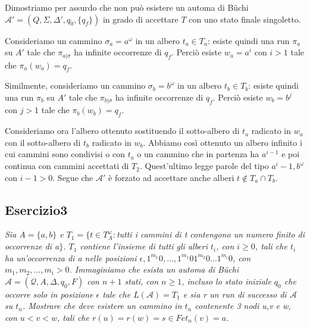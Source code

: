 \documentclass[12pt]{article}
\newcommand{\A}{\ensuremath{\mathcal{A}}\xspace}
\newcommand{\Buchi}{\ensuremath{\mathcal{A} = (\mathcal{Q},A,\Delta,q_0,F)}\xspace}
\newcommand{\buchi}{B\"uchi }
\begin{document}
\begin{center}
\end{center}

Dimostriamo per assurdo che non può esistere un automa di \buchi $\mathcal{A'} = (Q,\Sigma,\Delta',{q_0},\{q_f\})$ in grado di accettare $T$ con uno stato finale singoletto.

Consideriamo un cammino $\sigma_a=a^\omega$ in un albero $t_a \in T_a$: esiste quindi una run $\pi_a$ su $A'$ tale che $\pi_{a|\sigma}$ ha infinite occorrenze di $q_f$. Perciò esiste $w_a = a^i$ con $i>1$ tale che $\pi_a(w_a)=q_f$.

Similmente, consideriamo un cammino $\sigma_b=b^\omega$ in un albero $t_b \in T_b$: esiste quindi una run $\pi_b$ su $A'$ tale che $\pi_{b|\sigma}$ ha infinite occorrenze di $q_f$. Perciò esiste $w_b = b^j$ con $j>1$ tale che $\pi_b(w_b)=q_f$.

Consideriamo ora l'albero ottenuto sostituendo il sotto-albero di $t_a$ radicato in $w_a$ con il sotto-albero di $t_b$ radicato in $w_b$. Abbiamo così ottenuto un albero infinito i cui cammini sono condivisi o con $t_a$ o un cammino che in partenza ha $a^{i-1}$ e poi continua con cammini accettati di $T_2$. Quest'ultimo legge parole del tipo $a^i-1,b^\omega$ con $i-1>0$. Segue che $\mathcal{A'}$ è forzato ad accettare anche alberi $t \notin T_a \cap T_b.$

\subsection*{Esercizio3}
\textit{Sia $A=\{a,b\}$ e $T_1=\{t\in T^{\omega}_A:$tutti i cammini di t contengono un numero finito di occorrenze di a$\}$. $T_1$ contiene l'insieme di tutti gli alberi $t_i$, con $i\geqslant 0$, tali che $t_i$ ha un'occorrenza di a nelle posizioni $\epsilon, 1^{m_1}0,\ldots,1^{m_1}01^{m_2}0\ldots 1^{m_i}0$, con $m_1,m_2,\ldots,m_i>0$. Immaginiamo che esista un automa di \buchi $\Buchi$ con $n+1$ stati, con $n\geqslant 1$, incluso lo stato iniziale $q_0$ che occorre solo in posizione $\epsilon$ tale che $L(\A)=T_1$ e sia r un run di successo di $\A$ su $t_n$. Mostrare che deve esistere un cammino in $t_n$ contenente 3 nodi u,v e w, con $u<v<w$, tali che $r(u)=r(w)=s \in F e t_n(v)=a$.}
\end{document}

